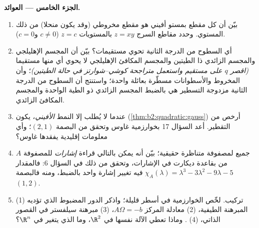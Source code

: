 \begin{problem}
\medskip
\noindent\textbf{الجزء الخامس --- العوائد.}
\begin{enumerate}[resume]
  \item بيّن أن كل مقطع  بمستو أفيني هو مقطع
        مخروطي (وقد يكون منحلا) من ذلك المستوي. وحدد مقاطع السرج
        $z = xy$ بالمستويات $z = c$ ($c \neq 0$ و$c = 0$).
  \item أي السطوح من الدرجة الثانية تحوي مستقيمات؟ بيّن أن المجسم
        الإهليلجي والمجسم الزائدي ذا الطيتين والمجسم المكافئ
        الإهليلجي لا يحوي أي منها مستقيما \emph{(اقصر $q$ على
        مستقيم واستعمل متراجحة كوشي--شوارتز في حالة الطيتين)}؛ وأن
        المخروط والأسطوانات مسطّرة بعائلة واحدة؛ واستنتج أن السطوح
        من الدرجة الثانية مزدوجة التسطير هي بالضبط المجسم الزائدي ذو
        الطية الواحدة والمجسم المكافئ الزائدي.
  \item عندما لا يُطلب إلا النمط \emph{الأفيني}، يكون 
        (\cref{thm:b2:quadratic:gauss}) أرخص من التقطير. أعد السؤال 17 بخوارزمية غاوس
        وتحقق من البصمة $(2, 1)$؛ وأي معلومات إقليدية يفقدها غاوس؟
  \item جميع  لمصفوفة متناظرة حقيقية؛ بيّن أنه يمكن
        بالتالي قراءة \emph{إشارات}  للمصفوفة $A$
        من  بقاعدة ديكارت في الإشارات، وتحقق من
        ذلك في السؤال 6: فالمقدار $\chi_A(\lambda) = \lambda^3 - 3\lambda^2
        - 9\lambda - 5$ فيه تغيير إشارة واحد
        بالضبط، ومنه فالبصمة $(1, 2)$.
  \item تركيب. لخّص الخوارزمية في أسطر قليلة؛ واذكر الدور المضبوط
        الذي تؤديه (1) المبرهنة الطيفية، (2) معادلة المركز $A\Omega = -b$،
        (3) مبرهنة سيلفستر في القصور الذاتي، (4) . وماذا
        تعطي الآلة نفسها في $\R^2$، وما الذي يتغير في $\R^n$؟
\end{enumerate}
\end{problem}

